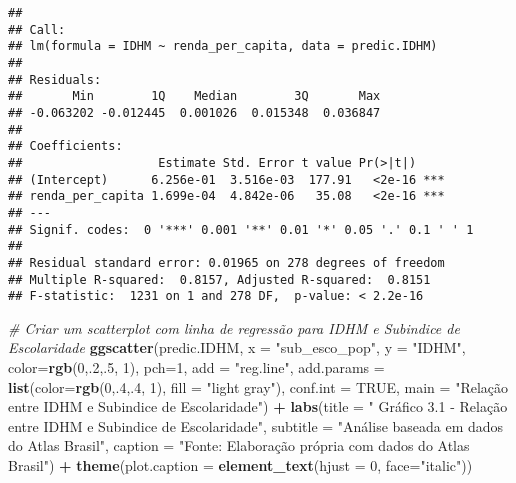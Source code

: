 \documentclass[
]{article}
\newenvironment{Shaded}{\begin{snugshade}}{\end{snugshade}}
\newcommand{\AttributeTok}[1]{\textcolor[rgb]{0.13,0.29,0.53}{#1}}
\newcommand{\CommentTok}[1]{\textcolor[rgb]{0.56,0.35,0.01}{\textit{#1}}}
\newcommand{\ConstantTok}[1]{\textcolor[rgb]{0.56,0.35,0.01}{#1}}
\newcommand{\DecValTok}[1]{\textcolor[rgb]{0.00,0.00,0.81}{#1}}
\newcommand{\FunctionTok}[1]{\textcolor[rgb]{0.13,0.29,0.53}{\textbf{#1}}}
\newcommand{\NormalTok}[1]{#1}
\newcommand{\SpecialCharTok}[1]{\textcolor[rgb]{0.81,0.36,0.00}{\textbf{#1}}}
\newcommand{\StringTok}[1]{\textcolor[rgb]{0.31,0.60,0.02}{#1}}
\begin{document}
\begin{verbatim}
## 
## Call:
## lm(formula = IDHM ~ renda_per_capita, data = predic.IDHM)
## 
## Residuals:
##       Min        1Q    Median        3Q       Max 
## -0.063202 -0.012445  0.001026  0.015348  0.036847 
## 
## Coefficients:
##                   Estimate Std. Error t value Pr(>|t|)    
## (Intercept)      6.256e-01  3.516e-03  177.91   <2e-16 ***
## renda_per_capita 1.699e-04  4.842e-06   35.08   <2e-16 ***
## ---
## Signif. codes:  0 '***' 0.001 '**' 0.01 '*' 0.05 '.' 0.1 ' ' 1
## 
## Residual standard error: 0.01965 on 278 degrees of freedom
## Multiple R-squared:  0.8157, Adjusted R-squared:  0.8151 
## F-statistic:  1231 on 1 and 278 DF,  p-value: < 2.2e-16
\end{verbatim}

\begin{Shaded}
\begin{Highlighting}[]
\CommentTok{\# Criar um scatterplot com linha de regressão para IDHM e Subindice de Escolaridade}
\FunctionTok{ggscatter}\NormalTok{(predic.IDHM, }\AttributeTok{x =} \StringTok{"sub\_esco\_pop"}\NormalTok{, }\AttributeTok{y =} \StringTok{"IDHM"}\NormalTok{, }
          \AttributeTok{color=}\FunctionTok{rgb}\NormalTok{(}\DecValTok{0}\NormalTok{,.}\DecValTok{2}\NormalTok{,.}\DecValTok{5}\NormalTok{,  }\DecValTok{1}\NormalTok{), }\AttributeTok{pch=}\DecValTok{1}\NormalTok{, }\AttributeTok{add =} \StringTok{"reg.line"}\NormalTok{, }
          \AttributeTok{add.params =} \FunctionTok{list}\NormalTok{(}\AttributeTok{color=}\FunctionTok{rgb}\NormalTok{(}\DecValTok{0}\NormalTok{,.}\DecValTok{4}\NormalTok{,.}\DecValTok{4}\NormalTok{,  }\DecValTok{1}\NormalTok{), }\AttributeTok{fill =} \StringTok{"light gray"}\NormalTok{), }
          \AttributeTok{conf.int =} \ConstantTok{TRUE}\NormalTok{, }\AttributeTok{main =} \StringTok{"Relação entre IDHM e Subindice de Escolaridade"}\NormalTok{) }\SpecialCharTok{+}
  \FunctionTok{labs}\NormalTok{(}\AttributeTok{title =} \StringTok{" Gráfico 3.1 {-} Relação entre IDHM e Subindice de Escolaridade"}\NormalTok{,}
          \AttributeTok{subtitle =} \StringTok{"Análise baseada em dados do Atlas Brasil"}\NormalTok{,}
          \AttributeTok{caption =} \StringTok{"Fonte: Elaboração própria com dados do Atlas Brasil"}\NormalTok{) }\SpecialCharTok{+}
  \FunctionTok{theme}\NormalTok{(}\AttributeTok{plot.caption =} \FunctionTok{element\_text}\NormalTok{(}\AttributeTok{hjust =} \DecValTok{0}\NormalTok{, }\AttributeTok{face=}\StringTok{"italic"}\NormalTok{))}
\end{Highlighting}
\end{Shaded}
\end{document}
